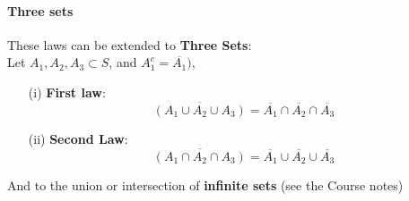 \documentclass[notes=show]{beamer}\usepackage[]{graphicx}\usepackage[]{color}
\newcommand{\bea}{\begin{eqnarray}}
\newcommand{\eea}{\end{eqnarray}}
\begin{document}
\begin{frame}{\secname}
\framesubtitle{Three sets}

These laws can be extended to \textbf{Three Sets}:\\[0.5em]

Let $A_{1}, A_{2}, A_{3} \subset S$, and  $A^{c}_{1} = \overline{A_{1}})$,\\[0.5em]

\begin{itemize}
\item[(i)] \textbf{First law}:
$$\overline{\left(A_{1}\cup A_{2}\cup A_{3}\right)} = \overline{A_{1}} \cap \overline{A_{2}} \cap \overline{A_{3}}$$
\item[(ii)] \textbf{Second Law}:
$$\overline{\left(A_{1}\cap A_{2}\cap A_{3}\right)} = \overline{A_{1}} \cup \overline{A_{2}} \cup \overline{A_{3}}$$
\end{itemize}

And to the union or intersection of \textbf{infinite sets} (see the Course notes)
\end{frame}

%

%
%
%
%

\end{document}
